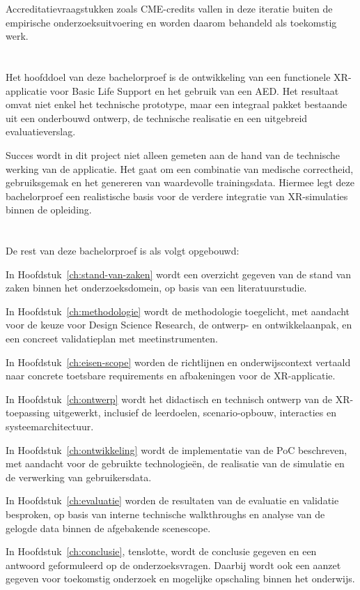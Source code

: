 Accreditatievraagstukken zoals CME-credits vallen in deze iteratie buiten de empirische onderzoeksuitvoering en worden daarom behandeld als toekomstig werk.

\section{}%
\label{sec:onderzoeksdoelstelling}

Het hoofddoel van deze bachelorproef is de ontwikkeling van een functionele XR-applicatie voor Basic Life Support en het gebruik van een AED. Het resultaat omvat niet enkel het technische prototype, maar een integraal pakket bestaande uit een onderbouwd ontwerp, de technische realisatie en een uitgebreid evaluatieverslag.

Succes wordt in dit project niet alleen gemeten aan de hand van de technische werking van de applicatie. Het gaat om een combinatie van medische correctheid, gebruiksgemak en het genereren van waardevolle trainingsdata. Hiermee legt deze bachelorproef een realistische basis voor de verdere integratie van XR-simulaties binnen de opleiding.

\section{}%
\label{sec:opzet-bachelorproef}

De rest van deze bachelorproef is als volgt opgebouwd:

In Hoofdstuk~\ref{ch:stand-van-zaken} wordt een overzicht gegeven van de stand van zaken binnen het onderzoeksdomein, op basis van een literatuurstudie.

In Hoofdstuk~\ref{ch:methodologie} wordt de methodologie toegelicht, met aandacht voor de keuze voor Design Science Research, de ontwerp- en ontwikkelaanpak, en een concreet validatieplan met meetinstrumenten.

In Hoofdstuk~\ref{ch:eisen-scope} worden de richtlijnen en onderwijscontext vertaald naar concrete toetsbare requirements en afbakeningen voor de XR-applicatie.

In Hoofdstuk~\ref{ch:ontwerp} wordt het didactisch en technisch ontwerp van de XR-toepassing uitgewerkt, inclusief de leerdoelen, scenario-opbouw, interacties en systeemarchitectuur.

In Hoofdstuk~\ref{ch:ontwikkeling} wordt de implementatie van de PoC beschreven, met aandacht voor de gebruikte technologieën, de realisatie van de simulatie en de verwerking van gebruikersdata.

In Hoofdstuk~\ref{ch:evaluatie} worden de resultaten van de evaluatie en validatie besproken, op basis van interne technische walkthroughs en analyse van de gelogde data binnen de afgebakende scenescope.

In Hoofdstuk~\ref{ch:conclusie}, tenslotte, wordt de conclusie gegeven en een antwoord geformuleerd op de onderzoeksvragen. Daarbij wordt ook een aanzet gegeven voor toekomstig onderzoek en mogelijke opschaling binnen het onderwijs.
